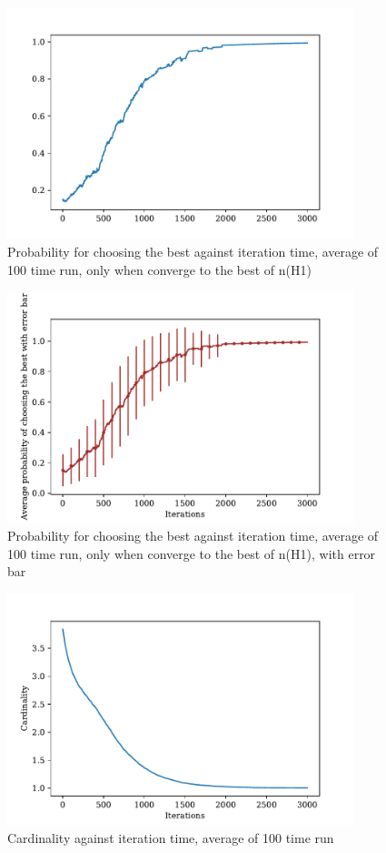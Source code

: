 \documentclass[a4paper,12pt]{article}
\begin{document}
	\begin{figure}[H]
		\centering
		\includegraphics[width=0.9\textwidth]{correct_pbest200_3000}
		\caption{Probability for choosing the best against iteration time, average of 100 time run, only when converge to the best of n(H1)}\label{correct_pbest200_3000}
	\end{figure}
	\begin{figure}[H]
		\centering
		\includegraphics[width=0.9\textwidth]{correct_pbest_errbar200_3000}
		\caption{Probability for choosing the best against iteration time, average of 100 time run, only when converge to the best of n(H1), with error bar}\label{correct_pbest_errbar200_3000}
	\end{figure}
%
	\begin{figure}[H]
	\centering
	\includegraphics[width=0.9\textwidth]{card200_3000}
	\caption{Cardinality against iteration time, average of 100 time run}\label{card200_3000}
	\end{figure}
\end{document}
